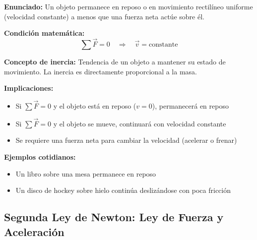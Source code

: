 \begin{seccion}
\begin{definicion}
    \textbf{Enunciado:} Un objeto permanece en reposo o en movimiento rectilíneo uniforme (velocidad constante) a menos que una fuerza neta actúe sobre él.
\end{definicion}

\begin{ecuacion}
\textbf{Condición matemática:}
$$\sum \vec{F} = 0 \quad \Rightarrow \quad \vec{v} = \text{constante}$$
\end{ecuacion}

\begin{definicion}
    \textbf{Concepto de inercia:} Tendencia de un objeto a mantener su estado de movimiento. La inercia es directamente proporcional a la masa.
\end{definicion}

\textbf{Implicaciones:}
\begin{itemize}
    \item Si $\sum \vec{F} = 0$ y el objeto está en reposo ($v = 0$), permanecerá en reposo
    \item Si $\sum \vec{F} = 0$ y el objeto se mueve, continuará con velocidad constante
    \item Se requiere una fuerza neta para cambiar la velocidad (acelerar o frenar)
\end{itemize}

\textbf{Ejemplos cotidianos:}
\begin{itemize}
    \item Un libro sobre una mesa permanece en reposo
    \item Un disco de hockey sobre hielo continúa deslizándose con poca fricción
\end{itemize}
\end{seccion}

\subsection{Segunda Ley de Newton: Ley de Fuerza y Aceleración}

